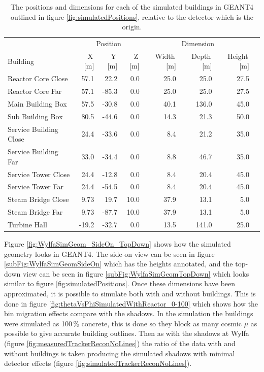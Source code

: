 \begin{table}[!h]
\centering
\begin{tabular}{lrrrrrrr}  
\toprule
\multicolumn{1}{c}{} & \multicolumn{3}{c}{Position} & \multicolumn{3}{c}{Dimension} \\
\cmidrule(r){2-4}
\cmidrule(r){5-7}
Building               & X\,[m] & Y\,[m] & Z\,[m] & Width\,[m] & Depth\,[m] & Height\,[m]\\
\midrule
Reactor Core Close     & 57.1   &  22.2  & 0.0     & 25.0       & 25.0       & 27.5\\
Reactor Core Far       & 57.1   & -85.3  & 0.0     & 25.0       & 25.0       & 27.5\\
Main Building Box      & 57.5   & -30.8  & 0.0     & 40.1       & 136.0      & 45.0\\
Sub Building Box       & 80.5   & -44.6  & 0.0     & 14.3       & 21.3       & 50.0\\
Service Building Close & 24.4   & -33.6  & 0.0     & 8.4        & 21.2       & 35.0\\
Service Building Far   & 33.0   & -34.4  & 0.0     & 8.8        & 46.7       & 35.0\\
Service Tower Close    & 24.4   & -12.8  & 0.0     & 8.4        & 20.4       & 45.0\\
Service Tower Far      & 24.4   & -54.5  & 0.0     & 8.4        & 20.4       & 45.0\\
Steam Bridge Close     & 9.73   &  19.7  & 10.0    & 37.9       & 13.1       & 5.0\\
Steam Bridge Far       & 9.73   & -87.7  & 10.0    & 37.9       & 13.1       & 5.0\\
Turbine Hall           & -19.2  & -32.7  & 0.0     & 13.5       & 141.0      & 25.0\\
\bottomrule  
\end{tabular}
\caption{The positions and dimensions for each of the simulated buildings in GEANT4 outlined in figure \ref{fig:simulatedPositions}, relative to the detector which is the origin.}
\label{tab:simulatedBuildingPositions}
\end{table}

Figure \ref{fig:WylfaSimGeom_SideOn_TopDown} shows how the simulated geometry looks in  GEANT4. The side-on view can be seen in figure \ref{subFig:WylfaSimGeomSideOn} which has the heights annotated, and the top-down view can be seen in figure \ref{subFig:WylfaSimGeomTopDown} which looks similar to figure \ref{fig:simulatedPositions}. Once these dimensions have been approximated, it is possible to simulate both with and without buildings. This is done in figure \ref{fig:thetaVsPhiSimulatedWithReactor_0-100} which shows how the bin migration effects compare with the shadows. In the simulation the buildings were simulated as 100\,\% concrete, this is done so they block as many cosmic $\mu$ as possible to give accurate building outlines. Then as with the shadows at Wylfa (figure \ref{fig:measuredTrackerReconNoLines}) the ratio of the data with and without buildings is taken producing the simulated shadows with minimal detector effects (figure \ref{fig:simulatedTrackerReconNoLines}). 

